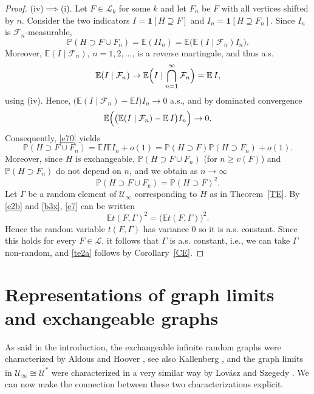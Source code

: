 \documentclass[11pt,reqno,tbtags]{amsart}
\numberwithin{equation}{section}
\theoremstyle{definition}
\theoremstyle{remark}
\newcommand{\refT}[1]{Theorem~\ref{#1}}
\newcommand{\refC}[1]{Corollary~\ref{#1}}
\newcommand\bigpar[1]{\bigl(#1\bigr)}
\newcommand\Bigpar[1]{\Bigl(#1\Bigr)}
\newcommand\ntoo{\ensuremath{{n\to\infty}}}
\newcommand\ie{i.e.\spacefactor=1000}
\newcommand{\as}{a.s.\spacefactor=1000}
\newcommand\E{\operatorname{\mathbb E{}}}
\renewcommand\P{\operatorname{\mathbb P{}}}
\newcommand\gG{\Gamma}
\newcommand\cF{\mathcal F}
\newcommand\cL{{\mathcal L}}
\newcommand\cU{{\mathcal U}}
\newcommand\ett[1]{\boldsymbol1[#1]}
\renewcommand{\=}{:=}
\newcommand{\Lovaszetal}{Lov\'asz and Szegedy}
\newcommand{\cux}{\cU^*}
\newcommand{\cuxq}{\overline{\cux}}
\newcommand{\cuoo}{\cU_\infty}
\newcommand{\exch}{exchangeable}
\begin{document}
\begin{proof}
  (iv)$\implies$(i).
Let $F\in\cL_k$ for some $k$ and let $F_n$ be $F$ with all vertices
shifted by $n$. Consider the two indicators $I=\ett{H\supseteq F}$ and
$I_n=\ett{H\supseteq F_n}$. Since $I_n$ is $\cF_n$-measurable,
\begin{equation}\label{e70}
  \P(H\supset F\cup F_n)
=\E(II_n)
=\E\bigpar{\E(I\mid\cF_n)I_n}.
\end{equation}
Moreover, $\E(I\mid\cF_n)$, $n=1,2,\dots$, is a reverse martingale,
and thus a.s.  
\begin{equation*}
\E(I\mid\cF_n)\to\E\Bigpar{I\mid\bigcap_{n=1}^\infty \cF_n} 
=\E I,
\end{equation*}
using (iv). 
Hence, $\bigpar{\E(I\mid\cF_n)-\E I}I_n\to0$ a.s., and by dominated
convergence 
\begin{equation*}
\E\Bigpar{ \bigpar{\E(I\mid\cF_n)-\E I}I_n}\to0.
\end{equation*}
Consequently, \eqref{e70} yields
\begin{equation*}
  \P(H\supset F\cup F_n) = \E I \E I_n + o(1)
=
\P(H \supset F) \P(H\supset F_n) + o(1).
\end{equation*}
Moreover, since $H$ is \exch, $\P(H\supset F\cup F_n)$ (for $n\ge v(F)$)
and $\P(H\supset F_n)$ do not depend on $n$, and we
obtain as \ntoo
\begin{equation}\label{e7}
  \P(H\supset F\cup F_k)=\P(H \supset F)^2.
\end{equation}
Let $\gG$ be a random element of $\cuoo$ corresponding to $H$ as in
\refT{TE}.
By \eqref{e2b} and \eqref{b3x}, \eqref{e7} can be written
\begin{equation*}
  \E t(F,\gG)^2=\bigpar{\E t(F,\gG)}^2.
\end{equation*}
Hence the random variable $t(F,\gG)$ has variance 0 so it is \as{}
constant. Since this holds for every $F\in\cL$, it follows that $\gG$ is
\as{} constant, \ie, we can take $\gG$ non-random, and \ref{te2a}
follows
by \refC{CE}.
\end{proof}


\section{Representations of graph limits and \exch{} graphs}\label{Srep}

As said in the introduction, 
the \exch{} infinite random graphs were characterized by Aldous
\cite{Aldous}
and Hoover \cite{Hoover},
see also Kallenberg \cite{Kallenberg:exch}, and the graph limits in
$\cuoo\cong\cuxq$ were characterized in a very similar way 
by \Lovaszetal{} \cite{LSz}. We can now make the connection between
these two characterizations explicit.
\end{document}

